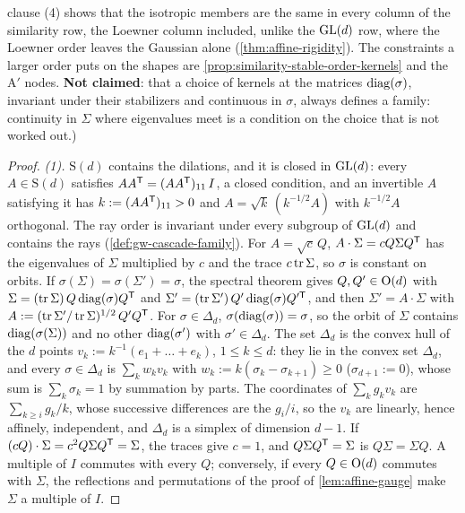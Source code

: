 \begin{proposition}
{clause (4) shows that the isotropic members are the same in every column of the similarity row, the
Loewner column included, unlike the $\mathrm{GL}(d)$ row, where the Loewner order leaves the Gaussian alone
(\ref{thm:affine-rigidity}). The constraints a larger order puts on the shapes are
\ref{prop:similarity-stable-order-kernels} and the A$'$ nodes. \textbf{Not claimed}: that a choice of
kernels at the matrices $\operatorname{diag}(\sigma)$, invariant under their stabilizers and continuous in $\sigma$,
always defines a family: continuity in $\Sigma$ where eigenvalues meet is a condition on the choice that
is not worked out.)}
\end{proposition}

\begin{proof}
\leanok
\emph{(1).} $\mathrm S(d)$ contains the dilations, and it is closed in $\mathrm{GL}(d)$: every $A \in \mathrm S(d)$
satisfies $AA^{\mathsf{T}} = (AA^{\mathsf{T}})_{11}\,I$, a closed condition, and an invertible $A$ satisfying it has
$k := (AA^{\mathsf{T}})_{11} > 0$ and $A = \sqrt k\,(k^{-1/2}A)$ with $k^{-1/2}A$ orthogonal. The ray order is invariant under every subgroup of $\mathrm{GL}(d)$
and contains the rays (\ref{def:gw-cascade-family}). For $A = \sqrt c\,Q$, $A\cdot\Sigma = cQ\Sigma Q^{\mathsf{T}}$
has the eigenvalues of $\Sigma$ multiplied by $c$ and the trace $c\operatorname{tr}\Sigma$, so $\sigma$ is constant on
orbits. If $\sigma(\Sigma) = \sigma(\Sigma') = \sigma$, the spectral theorem gives $Q, Q' \in \mathrm{O}(d)$ with
$\Sigma = (\operatorname{tr}\Sigma)\,Q\operatorname{diag}(\sigma)Q^{\mathsf{T}}$ and $\Sigma' = (\operatorname{tr}\Sigma')\,Q'\operatorname{diag}(\sigma)Q'^{\mathsf{T}}$, and then
$\Sigma' = A\cdot\Sigma$ with $A := (\operatorname{tr}\Sigma'/\operatorname{tr}\Sigma)^{1/2}\,Q'Q^{\mathsf{T}}$. For $\sigma \in \Delta_d$,
$\sigma(\operatorname{diag}(\sigma)) = \sigma$, so the orbit of $\Sigma$ contains $\operatorname{diag}(\sigma(\Sigma))$ and no other
$\operatorname{diag}(\sigma')$ with $\sigma' \in \Delta_d$. The set $\Delta_d$ is the convex hull of the $d$ points
$v_k := k^{-1}(e_1 + \dots + e_k)$, $1 \le k \le d$: they lie in the convex set $\Delta_d$, and every
$\sigma \in \Delta_d$ is $\sum_kw_kv_k$ with $w_k := k(\sigma_k - \sigma_{k+1}) \ge 0$ ($\sigma_{d+1} := 0$),
whose sum is $\sum_k\sigma_k = 1$ by summation by parts. The coordinates of $\sum_kg_kv_k$ are
$\sum_{k \ge i}g_k/k$, whose successive differences are the $g_i/i$, so the $v_k$ are linearly, hence
affinely, independent, and $\Delta_d$ is a simplex of dimension $d - 1$. If $(cQ)\cdot\Sigma = c^2Q\Sigma Q^{\mathsf{T}} = \Sigma$, the traces
give $c = 1$, and $Q\Sigma Q^{\mathsf{T}} = \Sigma$ is $Q\Sigma = \Sigma Q$. A multiple of $I$ commutes with every
$Q$; conversely, if every $Q \in \mathrm{O}(d)$ commutes with $\Sigma$, the reflections and permutations of the
proof of \ref{lem:affine-gauge} make $\Sigma$ a multiple of $I$.


\end{proof}
